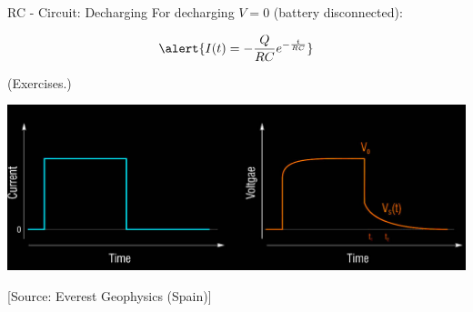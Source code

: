 \begin{frame}{RC - Circuit: Decharging}
  For decharging $V=0$ (battery disconnected):

  \begin{equation}
    \alert{I(t) = -\frac{Q}{RC}e^{-\frac{t}{RC}}} 
  \end{equation}

  (Exercises.)

\end{frame}






\begin{frame}
  \includegraphics[width=1.0\linewidth]{Figures/InducedPolarization/IP-curve_EverestGeophysics.jpg}

  \tiny[Source: Everest Geophysics (Spain)]
\end{frame}


